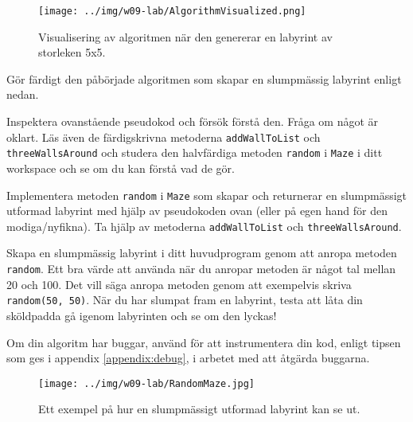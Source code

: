 \begin{figure}[H]
	\begin{center}
		\texttt{[image: ../img/w09-lab/AlgorithmVisualized.png]}
	\end{center}
	\caption{Visualisering av algoritmen när den genererar en labyrint av storleken 5x5.}
	\label{lab:maze:prims-algo-viz}
\end{figure}


\Task Gör färdigt den påbörjade algoritmen som skapar en slumpmässig labyrint enligt nedan.

\Subtask Inspektera ovanstående pseudokod och försök förstå den. Fråga om något är oklart. Läs även de färdigskrivna metoderna \texttt{addWallToList} och \texttt{threeWallsAround} och studera den halvfärdiga metoden \texttt{random} i \texttt{Maze} i ditt workspace och se om du kan förstå vad de gör.

\Subtask Implementera metoden \texttt{random} i \texttt{Maze} som skapar och returnerar en slumpmässigt utformad labyrint med hjälp av pseudokoden ovan (eller på egen hand för den modiga/nyfikna). Ta hjälp av metoderna \texttt{addWallToList} och \texttt{threeWallsAround}.

\Subtask Skapa en slumpmässig labyrint i ditt huvudprogram genom att anropa metoden \texttt{random}. Ett bra värde att använda när du anropar metoden är något tal mellan 20 och 100. Det vill säga anropa metoden genom att exempelvis skriva \texttt{random(50, 50)}. När du har slumpat fram en labyrint, testa att låta din sköldpadda gå igenom labyrinten och se om den lyckas!

\Subtask Om din algoritm har buggar, använd  för att instrumentera din kod, enligt tipsen som ges i appendix \ref{appendix:debug}, i arbetet med att åtgärda buggarna.

\begin{figure}[h]
	\begin{center}
		\texttt{[image: ../img/w09-lab/RandomMaze.jpg]}
	\end{center}
	\caption{Ett exempel på hur en slumpmässigt utformad labyrint kan se ut.}
\end{figure}

